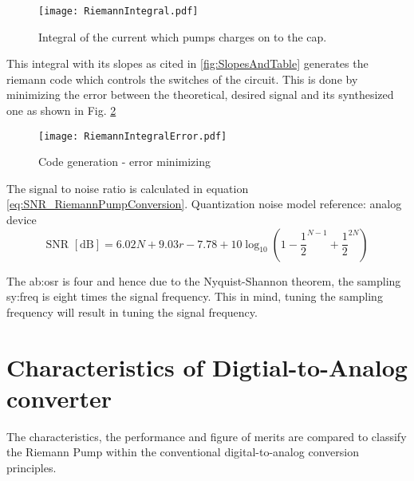 \begin{figure}[ht]
	\centering
  \texttt{[image: RiemannIntegral.pdf]}
	\caption{Integral of the current which pumps charges on to the cap.}
	\label{fig:RiemannIntegral}
\end{figure}
This integral with its slopes as cited in \ref{fig:SlopesAndTable} generates the riemann code which controls the switches of the circuit. This is done by minimizing the error between the theoretical, desired signal and its synthesized one as shown in Fig. \ref{fig:RiemannIntegralError}
 \begin{figure}[ht]
	\centering
  \texttt{[image: RiemannIntegralError.pdf]}
	\caption{Code generation - error minimizing}
	\label{fig:RiemannIntegralError}
\end{figure}
The signal to noise ratio is calculated in equation \ref{eq:SNR_RiemannPumpConversion}. Quantization noise model {reference: analog device}
\begin{equation}
	\text{SNR } [\si{\dB}] = 6.02N + 9.03r - 7.78 + 10\log_{10}(1 - \frac{1}{2}^{N-1} + \frac{1}{2}^{2N})
	\label{eq:SNR_RiemannPumpConversion}
\end{equation}



The \gls{ab:osr} is four and hence due to the Nyquist-Shannon theorem, the sampling \gls{sy:freq} is eight times the signal frequency.
This in mind, tuning the sampling frequency will result in tuning the signal frequency.

\section{Characteristics of Digtial-to-Analog converter}
\label{ch:characteristics}
The characteristics, the performance and figure of merits are compared to classify the Riemann Pump within the conventional digital-to-analog conversion principles.

